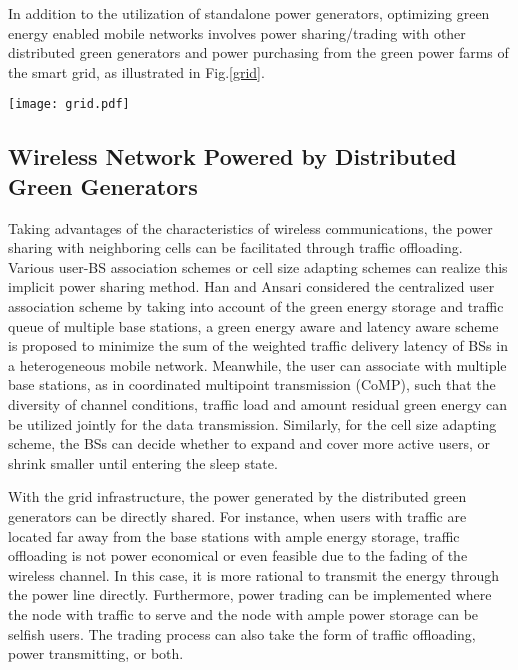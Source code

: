 \documentclass[journal,12pt,onecolumn]{IEEEtran}
\begin{document}
{In addition to the utilization of standalone power generators, optimizing green energy enabled mobile networks involves power sharing/trading with other distributed green generators and power purchasing from the green power farms of the smart grid, as illustrated in Fig.\ref{grid}.

\begin{figure*}
\centering
\texttt{[image: grid.pdf]}
\caption{Green energy powered cognitive radio network.}
\label{grid}
\end{figure*}

\subsection{Wireless Network Powered by Distributed Green Generators}
Taking advantages of the characteristics of wireless communications, the power sharing with neighboring cells can be facilitated through traffic offloading. Various user-BS association schemes or cell size adapting schemes can realize this implicit power sharing method. Han and Ansari \cite{aaaa} considered the centralized user association scheme by taking into account of the green energy storage and traffic queue of multiple base stations, a green energy aware and latency aware scheme is proposed to minimize the sum of the weighted traffic delivery latency of BSs in a heterogeneous mobile network. Meanwhile, the user can associate with multiple base stations, as in coordinated multipoint transmission (CoMP), such that the diversity of channel conditions, traffic load and amount residual green energy can be utilized jointly for the data transmission. Similarly, for the cell size adapting scheme, the BSs can decide whether to expand and cover more active users, or shrink smaller until entering the sleep state.




With the grid infrastructure, the power generated by the distributed green generators can be directly shared. For instance, when users with traffic are located far away from the base stations with ample energy storage, traffic offloading is not power economical or even feasible due to the fading of the wireless channel. In this case, it is more rational to transmit the energy through the power line directly. Furthermore, power trading can be implemented where the node with traffic to serve and the node with ample power storage can be selfish users. The trading process can also take the form of traffic offloading, power transmitting, or both.

}
\end{document}
